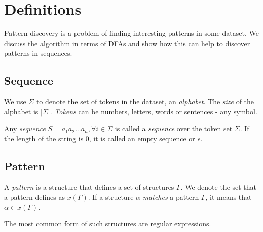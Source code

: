 \chapter{Definitions}

Pattern discovery is a problem of finding interesting patterns in
some dataset. We discuss the algorithm in terms of DFAs and
show how this can help to discover patterns in sequences.


\section{Sequence}

We use $\Sigma$ to denote the set of tokens in the dataset, an \emph{alphabet}. 
The \emph{size} of the alphabet is $|\Sigma|$. \emph{Tokens} can be numbers, 
letters, words or sentences - any symbol.

Any \emph{sequence} $S=a_1 a_2 ... a_n, \forall i \in \Sigma$ is called a \emph{sequence} 
over the token set $\Sigma$. If the length of the
string is $0$, it is called an empty sequence or $\epsilon$.

\section{Pattern}

A \emph{pattern} is a structure that defines a set of structures $\Gamma$. 
We denote the set that a pattern defines as $x(\Gamma)$.
If a structure $\alpha$ \emph{matches} a pattern $\Gamma$, it means that
$\alpha \in x(\Gamma)$.

The most common form of such structures are regular expressions.

\begin{comment}

\section{Finite automaton}

A \emph{deterministic finite automaton} (henceforth \emph{DFA}) is an 
finite state machine (henceforth \emph{FSM}) that accepts or rejects
a sequence of tokens. \todo{define}

A \emph{non-deterministic finite automaton} (henceforth \emph{NFA}) is an 
FSM that accepts or rejects a sequence of tokens. \todo{define}

Both patterns and sequences can be represented by NFAs and hence
is a good abstraction for both. This also means that if our algorithm
works on NFAs it must work on any other dataset that is defined in 
terms of NFA.

\end{comment}

